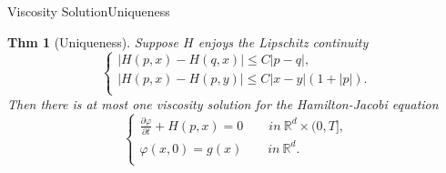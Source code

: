 \documentclass[english]{pkuslide}
\newtheorem{Thm}{Thm}
\begin{document}
	\begin{frame}{Viscosity Solution}{Uniqueness}
\begin{Thm}[Uniqueness]
Suppose $H$ enjoys the Lipschitz continuity 
\begin{equation}
  \left\{
   \begin{array}{l}
   |H(p, x) - H(q, x)| \leq C|p-q|,  \\
   |H(p, x) - H(p, y)| \leq C|x-y|(1+|p|).  \\
   \end{array}
  \right.
\end{equation} 
Then there is at most one viscosity solution for the Hamilton-Jacobi equation
\begin{equation}
  \left\{
   \begin{array}{l}
  \frac{\partial \varphi}{\partial t} + H(p, x)  = 0  \qquad in\  \mathbb{R}^{d} \times (0, T] ,  \\
   \varphi(x,0) = g(x)  \qquad in\  \mathbb{R}^{d}.  \\
   \end{array}
  \right.
\end{equation} 
\end{Thm}
	\end{frame}
\end{document}
